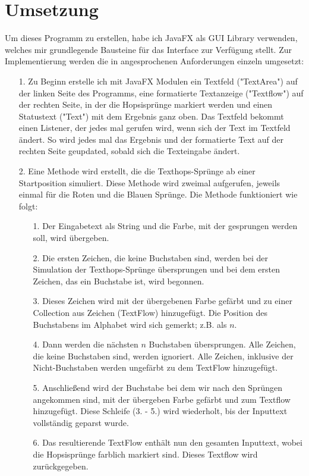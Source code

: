 \documentclass[a4paper,10pt,ngerman]{scrartcl}
\begin{document}
\section{Umsetzung}
Um dieses Programm zu erstellen, habe ich JavaFX als GUI Library verwenden, welches mir grundlegende Bausteine für das Interface zur Verfügung stellt. Zur Implementierung werden die in  angesprochenen Anforderungen einzeln umgesetzt:

\begin{itemize}
  \item [1.] Zu Beginn erstelle ich mit JavaFX Modulen ein Textfeld ("TextArea") auf der linken Seite des Programms, eine formatierte Textanzeige ("Textflow") auf der rechten Seite, in der die Hopsisprünge markiert werden und einen Statustext ("Text") mit dem Ergebnis ganz oben.
  Das Textfeld bekommt einen Listener, der jedes mal gerufen wird, wenn sich der Text im Textfeld ändert. So wird jedes mal das Ergebnis und der formatierte Text auf der rechten Seite geupdated, sobald sich die Texteingabe ändert.
  \item [2.] Eine Methode wird erstellt, die die Texthops-Sprünge ab einer Startposition simuliert. Diese Methode wird zweimal aufgerufen, jeweils einmal für die Roten und die Blauen Sprünge. Die Methode funktioniert wie folgt:
  \begin{itemize}
    \item [1.] Der Eingabetext als String und die Farbe, mit der gesprungen werden soll, wird übergeben.
    \item [2.] Die ersten Zeichen, die keine Buchstaben sind, werden bei der Simulation der Texthops-Sprünge übersprungen und bei dem ersten Zeichen, das ein Buchstabe ist, wird begonnen.
    \item [3.] Dieses Zeichen wird mit der übergebenen Farbe gefärbt und zu einer Collection aus Zeichen (TextFlow) hinzugefügt. Die Position des Buchstabens im Alphabet wird sich gemerkt; z.B. als $n$.
    \item [4.] Dann werden die nächsten $n$ Buchstaben übersprungen. Alle Zeichen, die keine Buchstaben sind, werden ignoriert. Alle Zeichen, inklusive der Nicht-Buchstaben werden ungefärbt zu dem TextFlow hinzugefügt.
    \item [5.] Anschließend wird der Buchstabe bei dem wir nach den Sprüngen angekommen sind, mit der übergeben Farbe gefärbt und zum Textflow hinzugefügt. Diese Schleife (3. - 5.) wird wiederholt, bis der Inputtext vollständig geparst wurde.
    \item [6.] Das resultierende TextFlow enthält nun den gesamten Inputtext, wobei die Hopsisprünge farblich markiert sind. Dieses Textflow wird zurückgegeben.

\end{itemize}
\end{itemize}
\end{document}
